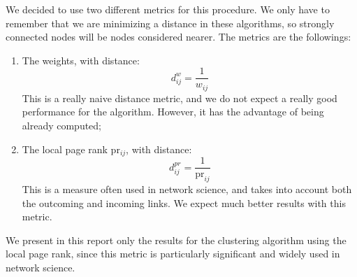 We decided to use two different metrics for this procedure. We only have to remember that 
we are minimizing a distance in these algorithms, so strongly connected nodes will be 
nodes considered nearer. The metrics are the followings:
\begin{enumerate}
    \item The weights, with distance:
        $$d^{w}_{ij}=\frac{1}{w_{ij}}$$
        This is a really naive distance metric, and we do not expect a really good performance
        for the algorithm. However, it has the advantage of being already computed;
    \item The local page rank pr$_{ij}$, with distance:
        $$d^{pr}_{ij}=\frac{1}{\mbox{pr}_{ij}}$$
        This is a measure often used in network science, and takes into account both the outcoming
        and incoming links. We expect much better results with this metric.
\end{enumerate}

We present in this report only the results for the clustering algorithm using the local page rank,
 since this metric is particularly significant and widely used in network science.

